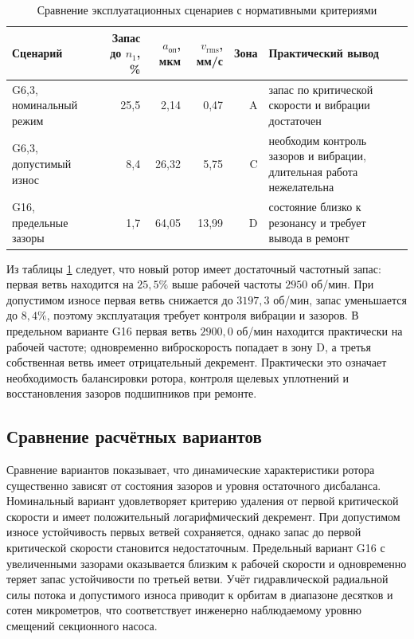 \documentclass[14pt,a4paper]{extarticle}
\numberwithin{equation}{section}
\numberwithin{figure}{section}
\numberwithin{table}{section}
\begin{document}
\begin{table}[H]
\centering
\small
\caption{Сравнение эксплуатационных сценариев с нормативными критериями}
\label{tab:normative_summary}
\begin{tabularx}{\textwidth}{>{\raggedright\arraybackslash}Xrrrr>{\raggedright\arraybackslash}X}
\toprule
Сценарий & Запас до $n_1$, \% & $a_{\text{оп}}$, мкм & $v_{\text{rms}}$, мм/с & Зона & Практический вывод \\
\midrule
G6,3, номинальный режим & 25{,}5 & 2{,}14 & 0{,}47 & A & запас по критической скорости и вибрации достаточен \\
G6,3, допустимый износ & 8{,}4 & 26{,}32 & 5{,}75 & C & необходим контроль зазоров и вибрации, длительная работа нежелательна \\
G16, предельные зазоры & 1{,}7 & 64{,}05 & 13{,}99 & D & состояние близко к резонансу и требует вывода в ремонт \\
\bottomrule
\end{tabularx}
\end{table}

Из таблицы \ref{tab:normative_summary} следует, что новый ротор имеет достаточный частотный запас: первая ветвь находится на $25{,}5\%$ выше рабочей частоты $2950$ об/мин. При допустимом износе первая ветвь снижается до $3197{,}3$ об/мин, запас уменьшается до $8{,}4\%$, поэтому эксплуатация требует контроля вибрации и зазоров. В предельном варианте G16 первая ветвь $2900{,}0$ об/мин находится практически на рабочей частоте; одновременно виброскорость попадает в зону D, а третья собственная ветвь имеет отрицательный декремент. Практически это означает необходимость балансировки ротора, контроля щелевых уплотнений и восстановления зазоров подшипников при ремонте.

\subsection{Сравнение расчётных вариантов}

Сравнение вариантов показывает, что динамические характеристики ротора существенно зависят от состояния зазоров и уровня остаточного дисбаланса. Номинальный вариант удовлетворяет критерию удаления от первой критической скорости и имеет положительный логарифмический декремент. При допустимом износе устойчивость первых ветвей сохраняется, однако запас до первой критической скорости становится недостаточным. Предельный вариант G16 с увеличенными зазорами оказывается близким к рабочей скорости и одновременно теряет запас устойчивости по третьей ветви. Учёт гидравлической радиальной силы потока и допустимого износа приводит к орбитам в диапазоне десятков и сотен микрометров, что соответствует инженерно наблюдаемому уровню смещений секционного насоса.
\end{document}
